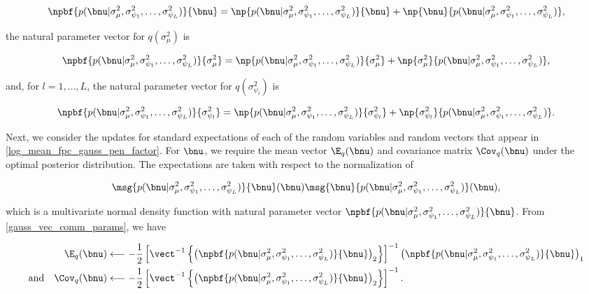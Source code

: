 \documentclass[12pt]{article}
\def\sigsqmu{\sigma^2_{\mu}}
\newcommand\sigsqpsi[1]{\sigma^2_{\psi_{#1}}}
\theoremstyle{plain}
\theoremstyle{definition}
\theoremstyle{remark}
\begin{document}
\[
	\npbf{p(\bnu | \sigsqmu, \sigsqpsi{1}, \dots, \sigsqpsi{L})}{\bnu} =
		\np{p(\bnu | \sigsqmu, \sigsqpsi{1}, \dots, \sigsqpsi{L})}{\bnu}
		+ \np{\bnu}{p(\bnu | \sigsqmu, \sigsqpsi{1}, \dots, \sigsqpsi{L})},
\]

\noindent the natural parameter vector for $q (\sigsqmu)$ is

\[
	\npbf{p(\bnu | \sigsqmu, \sigsqpsi{1}, \dots, \sigsqpsi{L})}{\sigsqmu} =
		\np{p(\bnu | \sigsqmu, \sigsqpsi{1}, \dots, \sigsqpsi{L})}{\sigsqmu}
		+ \np{\sigsqmu}{p(\bnu | \sigsqmu, \sigsqpsi{1}, \dots, \sigsqpsi{L})},
\]

\noindent and, for $l = 1, \dots, L$, the natural parameter vector for $q(\sigsqpsi{l})$ is

\[
	\npbf{p(\bnu | \sigsqmu, \sigsqpsi{1}, \dots, \sigsqpsi{L})}{\sigsqpsi{l}} =
		\np{p(\bnu | \sigsqmu, \sigsqpsi{1}, \dots, \sigsqpsi{L})}{\sigsqpsi{l}}
		+ \np{\sigsqpsi{l}}{p(\bnu | \sigsqmu, \sigsqpsi{1}, \dots, \sigsqpsi{L})}.
\]

Next, we consider the updates for standard expectations of each of the random variables and random vectors
that appear in \eqref{log_mean_fpc_gauss_pen_factor}. For $\bnu$, we require the mean vector $\E_q (\bnu)$
and covariance matrix $\Cov_q (\bnu)$ under the optimal posterior distribution. The expectations are taken with
respect to the normalization of

\[
	\msg{p(\bnu | \sigsqmu, \sigsqpsi{1}, \dots, \sigsqpsi{L})}{\bnu} (\bnu)
	\msg{\bnu}{p(\bnu | \sigsqmu, \sigsqpsi{1}, \dots, \sigsqpsi{L})} (\bnu),
\]

\noindent which is a multivariate normal density function with natural parameter vector $\npbf{p(\bnu | \sigsqmu,
\sigsqpsi{1}, \dots, \sigsqpsi{L})}{\bnu}$. From \eqref{gauss_vec_comm_params}, we have

\begin{align}
\begin{split}
	\E_q (\bnu)
		&\longleftarrow
			-\frac12 \left[
				\vect^{-1} \left\{
					\left( \npbf{p(\bnu | \sigsqmu, \sigsqpsi{1}, \dots, \sigsqpsi{L})}{\bnu} \right)_2
				\right\}
			\right]^{-1} \left( \npbf{p(\bnu | \sigsqmu, \sigsqpsi{1}, \dots, \sigsqpsi{L})}{\bnu} \right)_1 \\
	\text{and} \quad
	\Cov_q (\bnu)
		&\longleftarrow
			-\frac12 \left[
				\vect^{-1} \left\{
					\left( \npbf{p(\bnu | \sigsqmu, \sigsqpsi{1}, \dots, \sigsqpsi{L})}{\bnu} \right)_2
				\right\}
			\right]^{-1}.
\end{split}
\label{mom_pen_nu}
\end{align}
\end{document}
